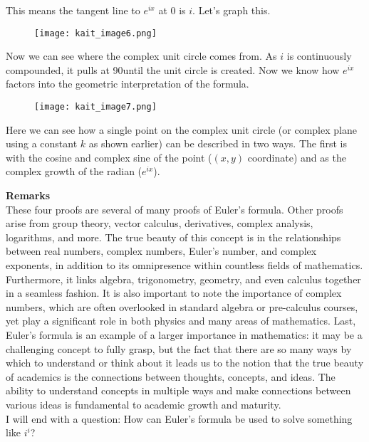 \documentclass{article}
\theoremstyle{definition}
\begin{document}
\noindent
This means the tangent line to $e^{ix}$ at $0$ is $i$. Let’s graph this. 

\begin{figure}[h!]
\begin{center}
\texttt{[image: kait\_image6.png]} 
\end{center}
\end{figure}

\noindent
Now we can see where the complex unit circle comes from. As $i$ is continuously compounded, it pulls at 90\degree until the unit circle is created. Now we know how $e^{ix}$ factors into the geometric interpretation of the formula. 


\begin{figure}[h!]
\begin{center}
\texttt{[image: kait\_image7.png]} 
\end{center}
\end{figure}


\noindent
Here we can see how a single point on the complex unit circle (or complex plane using a constant $k$ as shown earlier) can be described in two ways. The first is with the cosine and complex sine of the point ($(x,y)$ coordinate) and as the complex growth of the radian ($e^{ix}$).

\vspace{5mm} %
\noindent
\textbf{Remarks}
\vspace{5mm} %
\\
\noindent
These four proofs are several of many proofs of Euler’s formula. Other proofs arise from group theory, vector calculus, derivatives, complex analysis, logarithms, and more. The true beauty of this concept is in the relationships between real numbers, complex numbers, Euler’s number, and complex exponents, in addition to its omnipresence within countless fields of mathematics. Furthermore, it links algebra, trigonometry, geometry, and even calculus together in a seamless fashion. It is also important to note the importance of complex numbers, which are often overlooked in standard algebra or pre-calculus courses, yet play a significant role in both physics and many areas of mathematics. Last, Euler’s formula is an example of a larger importance in mathematics: it may be a challenging concept to fully grasp, but the fact that there are so many ways by which to understand or think about it leads us to the notion that the true beauty of academics is the connections between thoughts, concepts, and ideas. The ability to understand concepts in multiple ways and make connections between various ideas is fundamental to academic growth and maturity. 
\vspace{5mm} %
\\
\noindent
I will end with a question: How can Euler’s formula be used to solve something like $i^i$?
\end{document}
